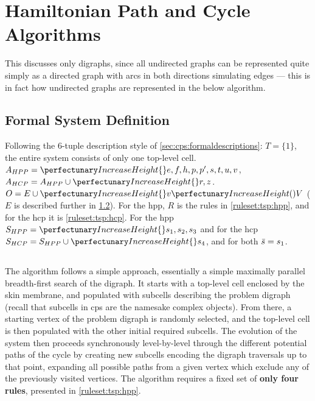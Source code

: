 \section{ Hamiltonian Path and Cycle Algorithms}\label{sec:tsp:algohpp}
This  discusses only digraphs, since all undirected graphs can be represented quite simply as a directed graph with arcs in both directions simulating edges --- this is in fact how undirected graphs are represented in the below algorithm.

\subsection{Formal System Definition}

Following the 6-tuple description style of \cref{sec:cps:formaldescriptions}:  \(T = \{1\}\), \ie{} the entire system consists of only one top-level cell.  \(A_{HPP} = \cpset{e, f, h, p, p', s, t, u, v}\), \(A_{HCP} = A_{HPP} \cup \cpset{r, z}\).  \(O = E \cup \cpset{\cpfunc{v}{V}}\) (\(E\) is described further in \cref{sec:tsp:hpp}).  For the \gls{hpp}, \(R\) is the rules in \cref{ruleset:tsp:hpp}, and for the \gls{hcp} it is \cref{ruleset:tsp:hcp}.  For the \gls{hpp} \(S_{HPP} = \cpset{s_1, s_2, s_3}\) and for the \gls{hcp} \(S_{HCP} = S_{HPP} \cup \cpset{s_4}\), and for both \(\Bar{s} = s_1\).



\subsection{}\label{sec:tsp:hpp}

The algorithm follows a simple approach, essentially a simple maximally parallel breadth-first search of the digraph.  It starts with a top-level cell enclosed by the skin membrane, and populated with subcells describing the problem digraph (recall that subcells in \gls{cps} are the namesake complex objects).  From there, a starting vertex of the problem digraph is randomly selected, and the top-level cell is then populated with the other initial required subcells.  The evolution of the system then proceeds synchronously level-by-level through the different potential paths of the cycle by creating new subcells encoding the digraph traversals up to that point, expanding all possible paths from a given vertex which exclude any of the previously visited vertices.  The algorithm requires a fixed set of \textbf{only four rules}, presented in \cref{ruleset:tsp:hpp}.

